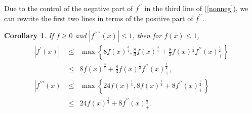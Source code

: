 \documentclass{amsart}
\theoremstyle{plain}
\newtheorem{corollary}[theorem]{Corollary}
\numberwithin{equation}{section}
\begin{document}
Due to the control of the negative part of $f^{\prime \prime }$ in the third
line of (\ref{nonneg}), we can rewrite the first two lines in terms of the
positive part of $f^{\prime \prime }$.

\begin{corollary}
\label{combine}If $f\geq 0$ and $\left\vert f^{\prime \prime \prime \prime
}\left( x\right) \right\vert \leq 1$, then for $f\left( x\right) \leq 1$, 
\begin{eqnarray*}
\left\vert f^{\prime }\left( x\right) \right\vert &\leq &\max \left\{
8f\left( x\right) ^{\frac{3}{4}},\frac{8}{3}f\left( x\right) ^{\frac{3}{4}}+%
\frac{8}{3}f\left( x\right) ^{\frac{1}{2}}f^{\prime \prime }\left( x\right)
_{+}^{\frac{1}{2}}\right\} \\
&\leq &8f\left( x\right) ^{\frac{3}{4}}+\frac{8}{3}f\left( x\right) ^{\frac{1%
}{2}}f^{\prime \prime }\left( x\right) _{+}^{\frac{1}{2}}, \\
\left\vert f^{\prime \prime \prime }\left( x\right) \right\vert &\leq &\max
\left\{ 24f\left( x\right) ^{\frac{1}{4}},8f\left( x\right) ^{\frac{1}{4}%
}+8f^{\prime \prime }\left( x\right) _{+}^{\frac{1}{2}}\right\} \\
&\leq &24f\left( x\right) ^{\frac{1}{4}}+8f^{\prime \prime }\left( x\right)
_{+}^{\frac{1}{2}}.
\end{eqnarray*}
\end{corollary}
\end{document}
